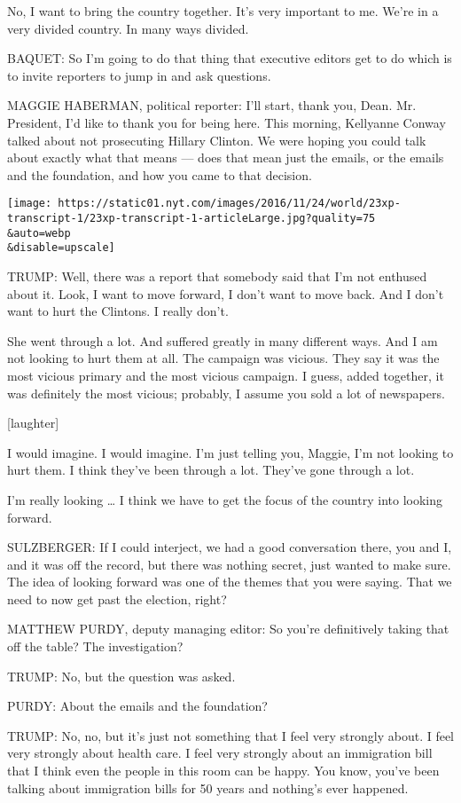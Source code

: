 No, I want to bring the country together. It's very important to me.
We're in a very divided country. In many ways divided.

BAQUET: So I'm going to do that thing that executive editors get to do
which is to invite reporters to jump in and ask questions.

MAGGIE HABERMAN, political reporter: I'll start, thank you, Dean. Mr.
President, I'd like to thank you for being here. This morning, Kellyanne
Conway talked about not prosecuting Hillary Clinton. We were hoping you
could talk about exactly what that means --- does that mean just the
emails, or the emails and the foundation, and how you came to that
decision.

\texttt{[image: https://static01.nyt.com/images/2016/11/24/world/23xp-transcript-1/23xp-transcript-1-articleLarge.jpg?quality=75\\\&auto=webp\\\&disable=upscale]}

TRUMP: Well, there was a report that somebody said that I'm not enthused
about it. Look, I want to move forward, I don't want to move back. And I
don't want to hurt the Clintons. I really don't.

She went through a lot. And suffered greatly in many different ways. And
I am not looking to hurt them at all. The campaign was vicious. They say
it was the most vicious primary and the most vicious campaign. I guess,
added together, it was definitely the most vicious; probably, I assume
you sold a lot of newspapers.

{[}laughter{]}

I would imagine. I would imagine. I'm just telling you, Maggie, I'm not
looking to hurt them. I think they've been through a lot. They've gone
through a lot.

I'm really looking \ldots{} I think we have to get the focus of the
country into looking forward.

SULZBERGER: If I could interject, we had a good conversation there, you
and I, and it was off the record, but there was nothing secret, just
wanted to make sure. The idea of looking forward was one of the themes
that you were saying. That we need to now get past the election, right?

MATTHEW PURDY, deputy managing editor: So you're definitively taking
that off the table? The investigation?

TRUMP: No, but the question was asked.

PURDY: About the emails and the foundation?

TRUMP: No, no, but it's just not something that I feel very strongly
about. I feel very strongly about health care. I feel very strongly
about an immigration bill that I think even the people in this room can
be happy. You know, you've been talking about immigration bills for 50
years and nothing's ever happened.

